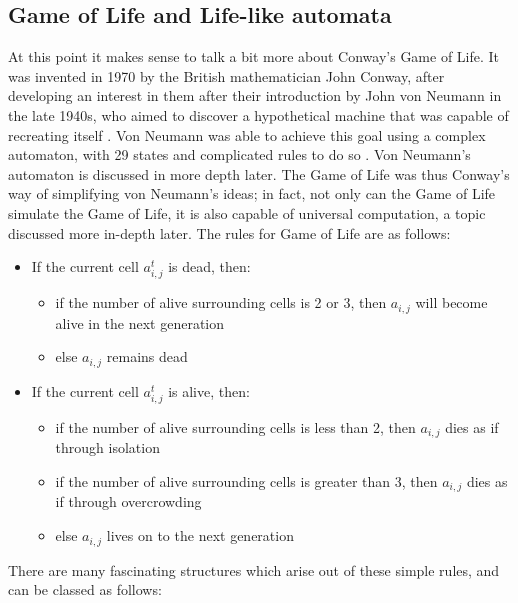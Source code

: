\documentclass[11pt,a4paper]{article}
\begin{document}
    \subsection{Game of Life and Life-like automata}
    At this point it makes sense to talk a bit more about Conway's Game of Life.
    It was invented in 1970 by the British mathematician John Conway, after
    developing an interest in them after their introduction by John von Neumann
    in the late 1940s, who aimed to discover a hypothetical machine that was
    capable of recreating itself \cite{GameOfLife}. Von Neumann was able to
    achieve this goal using a complex automaton, with 29 states and complicated
    rules to do so \cite{VonNeumannCA}. Von Neumann's automaton is discussed in
    more depth later. The Game of Life was thus Conway's way of simplifying von
    Neumann's ideas; in fact, not only can the Game of Life simulate the Game of
    Life, it is also capable of universal computation, a topic discussed more
    in-depth later. The rules for Game of Life are as follows:

    \begin{itemize}
        \item If the current cell $a_{i,j}^t$ is dead, then:
            \begin{itemize}
                \item if the number of alive surrounding cells is 2 or 3,
                    then $a_{i,j}$ will become alive in the next generation
                \item else $a_{i,j}$ remains dead
            \end{itemize}
        \item If the current cell $a_{i,j}^t$ is alive, then:
            \begin{itemize}
                \item if the number of alive surrounding cells is less than 2,
                    then $a_{i,j}$ dies as if through isolation
                \item if the number of alive surrounding cells is greater than
                    3, then $a_{i,j}$ dies as if through overcrowding
                \item else $a_{i,j}$ lives on to the next generation
            \end{itemize}
    \end{itemize}

    There are many fascinating structures which arise out of these simple rules,
    and can be classed as follows:
\end{document}
